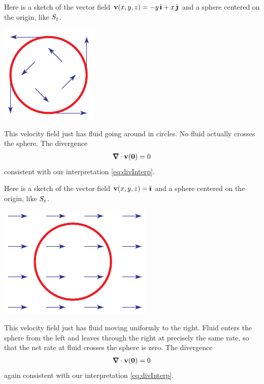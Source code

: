 \begin{eg}\label{eg:divInterpB}
Here is a sketch of the vector field $\mathbf{v}(x,y,z) = -y\,\hat{\pmb{\imath}}+x\,\hat{\pmb{\jmath}}$
and a sphere centered on the origin, like $S_\varepsilon$. 
\begin{nfig}
\begin{center}
    \includegraphics{vortexDiv.pdf}
\end{center}
\end{nfig}
This velocity field just has fluid going around in circles.
No fluid actually crosses the sphere. The divergence
\begin{align*}
\vnabla\cdot\vv(\vZero) = 0
\end{align*}
consistent with our interpretation \eqref{eq:divInterp}.
\end{eg}


\begin{eg}\label{eg:divInterpC}
Here is a sketch of the vector field $\mathbf{v}(x,y,z) = \hat{\pmb{\imath}}$
and a sphere centered on the origin, like $S_\varepsilon$. 
\begin{nfig}
\begin{center}
    \includegraphics{transDiv.pdf}
\end{center}
\end{nfig}
This velocity field just has fluid moving uniformly to the right.
Fluid enters the sphere from the left and leaves through the right at 
precisely the same rate, so that the net rate at fluid crosses the 
sphere is zero. The divergence
\begin{align*}
\vnabla\cdot\vv(\vZero) = 0
\end{align*}
again consistent with our interpretation \eqref{eq:divInterp}.
\end{eg}



